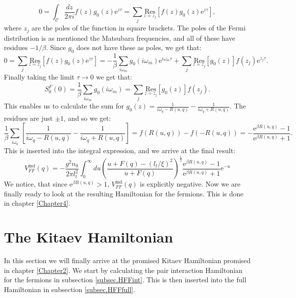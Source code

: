 \begin{equation}
0 = \int_\mathcal{C} \frac{dz}{2\pi i} f(z)g_0(z)\text{e}^{z\tau} = \sum_j \underset{z=z_j}{\text{Res}}[f(z)g_0(z)\text{e}^{z\tau}], \nonumber
\end{equation}
where $z_j$ are the poles of the function in square brackets. The poles of the Fermi distribution is as mentioned the Matsubara frequencies, and all of these have residues $-1/\beta$. Since $g_0$ does not have these as poles, we get that:
\begin{equation}
0 = \sum_j \underset{z=z_j}{\text{Res}}[f(z)g_0(z)\text{e}^{z\tau}] = -\frac{1}{\beta}\sum_{i\omega_m}g_0(i\omega_m)\text{e}^{i\omega_m\tau} + \sum_j \underset{z=z_j}{\text{Res}}[g_0(z)]f(z_j)\text{e}^{z_j\tau}. \nonumber
\end{equation}
Finally taking the limit $\tau \to 0$ we get that:
\begin{equation}
S^F_0(0)=\frac{1}{\beta}\sum_{i\omega_m}g_0(i\omega_m) = \sum_j \underset{z=z_j}{\text{Res}}[g_0(z)]f(z_j).
\label{eq.FermionMatsubaraSum}
\end{equation}
This enables us to calculate the sum for $g_0(z) = \frac{1}{i\omega_q-R(u,q)}-\frac{1}{i\omega_q+R(u,q)}$. The residues are just $\pm 1$, and so we get:
\begin{equation}
\frac{1}{\beta}\sum_{i\omega_q}\left[\frac{1}{i\omega_q-R(u,q)}-\frac{1}{i\omega_q+R(u,q)}\right] = f(R(u,q))-f(-R(u,q)) = -\frac{\text{e}^{\beta R(u,q)}-1}{\text{e}^{\beta R(u,q)}+1}. \nonumber
\end{equation}
This is inserted into the integral expression, and we arrive at the final result:
\begin{equation}
V^\text{ind}_{FF}(q) = -\frac{g^2n_0}{2\pi l_t^2}\int_0^\infty du \left(\frac{u+F(q)-\left(l_t/\xi\right)^2}{u+F(q)}\right)^{\frac{1}{2}}\frac{\text{e}^{\beta R(u,q)}-1}{\text{e}^{\beta R(u,q)}+1}
\text{e}^{-u}
\label{eq.VFFq}
\end{equation}
We notice, that since $\text{e}^{\beta R(u,q)} > 1$, $V^\text{ind}_{FF}(q)$ is explicitly negative. Now we are finally ready to look at the resulting Hamiltonian for the fermions. This is done in chapter \ref{Chapter4}.


\section{The Kitaev Hamiltonian}
In this section we will finally arrive at the promised Kitaev Hamiltonian promised in chapter \ref{Chapter2}. We start by calculating the pair interaction Hamiltonian for the fermions in subsection \ref{subsec.HFFint}. This is then inserted into the full Hamiltonian in subsection \ref{subsec.HFFfull}.

